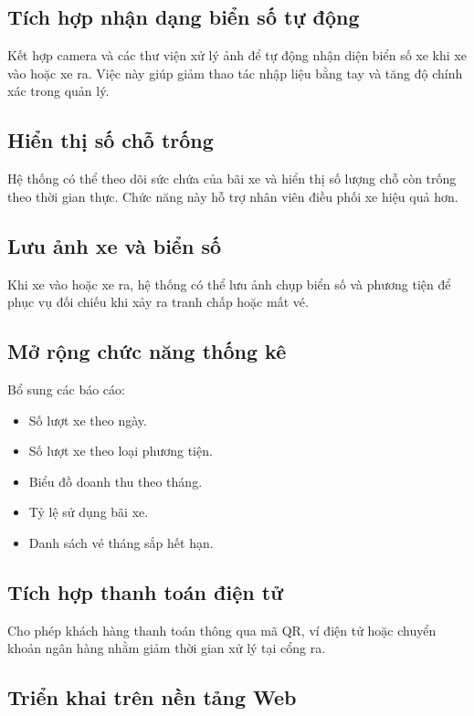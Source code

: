 \subsection{Tích hợp nhận dạng biển số tự động}

Kết hợp camera và các thư viện xử lý ảnh để tự động nhận diện biển
số xe khi xe vào hoặc xe ra. Việc này giúp giảm thao tác nhập liệu
bằng tay và tăng độ chính xác trong quản lý.

\subsection{Hiển thị số chỗ trống}

Hệ thống có thể theo dõi sức chứa của bãi xe và hiển thị số lượng
chỗ còn trống theo thời gian thực. Chức năng này hỗ trợ nhân viên
điều phối xe hiệu quả hơn.

\subsection{Lưu ảnh xe và biển số}

Khi xe vào hoặc xe ra, hệ thống có thể lưu ảnh chụp biển số và
phương tiện để phục vụ đối chiếu khi xảy ra tranh chấp hoặc mất vé.

\subsection{Mở rộng chức năng thống kê}

Bổ sung các báo cáo:

\begin{itemize}
    \item Số lượt xe theo ngày.
    \item Số lượt xe theo loại phương tiện.
    \item Biểu đồ doanh thu theo tháng.
    \item Tỷ lệ sử dụng bãi xe.
    \item Danh sách vé tháng sắp hết hạn.
\end{itemize}

\subsection{Tích hợp thanh toán điện tử}

Cho phép khách hàng thanh toán thông qua mã QR, ví điện tử hoặc
chuyển khoản ngân hàng nhằm giảm thời gian xử lý tại cổng ra.

\subsection{Triển khai trên nền tảng Web}

